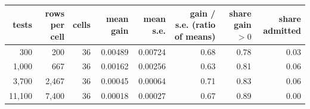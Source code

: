 \begin{tabular}{rrrrrrrr}
\toprule
tests & rows per cell & cells & mean gain & mean s.e. & gain / s.e. (ratio of means) & share gain $>0$ & share admitted \\
\midrule
300 & 200 & 36 & 0.00489 & 0.00724 & 0.68 & 0.78 & 0.03 \\
1,000 & 667 & 36 & 0.00162 & 0.00256 & 0.63 & 0.81 & 0.06 \\
3,700 & 2,467 & 36 & 0.00045 & 0.00064 & 0.71 & 0.83 & 0.06 \\
11,100 & 7,400 & 36 & 0.00018 & 0.00027 & 0.67 & 0.89 & 0.00 \\
\bottomrule
\end{tabular}
